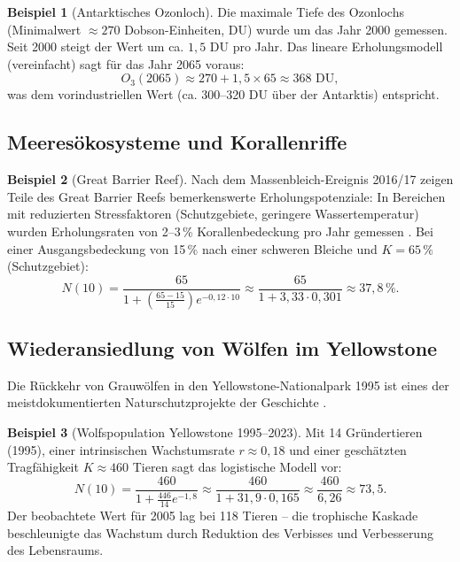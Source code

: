 ﻿\documentclass[a4paper,12pt]{article}
\theoremstyle{definition}
\newtheorem{beispiel}{Beispiel}
\begin{document}
\begin{beispiel}[Antarktisches Ozonloch]
	Die maximale Tiefe des Ozonlochs (Minimalwert $\approx 270$ Dobson-Einheiten, DU) wurde um das Jahr 2000 gemessen. Seit 2000 steigt der Wert um ca. $1{,}5$ DU pro Jahr. Das lineare Erholungsmodell (vereinfacht) sagt für das Jahr 2065 voraus:
	\[
	O_3(2065) \approx 270 + 1{,}5 \times 65 \approx 368\text{ DU},
	\]
	was dem vorindustriellen Wert (ca. 300--320 DU über der Antarktis) entspricht.
\end{beispiel}

\subsection{Meeresökosysteme und Korallenriffe}

\begin{beispiel}[Great Barrier Reef]
	Nach dem Massenbleich-Ereignis 2016/17 zeigen Teile des Great Barrier Reefs bemerkenswerte Erholungspotenziale: In Bereichen mit reduzierten Stressfaktoren (Schutzgebiete, geringere Wassertemperatur) wurden Erholungsraten von 2--3\,\% Korallenbedeckung pro Jahr gemessen \cite{hughes2018global}. Bei einer Ausgangsbedeckung von 15\,\% nach einer schweren Bleiche und $K = 65\,\%$ (Schutzgebiet):
	\[
	N(10) = \frac{65}{1 + \left(\frac{65-15}{15}\right)e^{-0{,}12 \cdot 10}} \approx \frac{65}{1 + 3{,}33 \cdot 0{,}301} \approx 37{,}8\,\%.
	\]
\end{beispiel}

\subsection{Wiederansiedlung von Wölfen im Yellowstone}

Die Rückkehr von Grauwölfen in den Yellowstone-Nationalpark 1995 ist eines der meistdokumentierten Naturschutzprojekte der Geschichte \cite{ripple2014wolves}.

\begin{beispiel}[Wolfspopulation Yellowstone 1995--2023]
	Mit 14 Gründertieren (1995), einer intrinsischen Wachstumsrate $r \approx 0{,}18$ und einer geschätzten Tragfähigkeit $K \approx 460$ Tieren sagt das logistische Modell vor:
	\[
	N(10) = \frac{460}{1 + \frac{446}{14} e^{-1{,}8}} \approx \frac{460}{1 + 31{,}9 \cdot 0{,}165} \approx \frac{460}{6{,}26} \approx 73{,}5.
	\]
	Der beobachtete Wert für 2005 lag bei 118 Tieren -- die trophische Kaskade beschleunigte das Wachstum durch Reduktion des Verbisses und Verbesserung des Lebensraums.
\end{beispiel}
\end{document}
